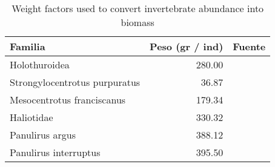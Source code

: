 \begin{table}[H]

\caption{\label{tab:w_fact}Weight factors used to convert invertebrate abundance into biomass}
\centering
\begin{tabular}[t]{lrl}
\toprule
Familia & Peso (gr / ind) & Fuente\\
\midrule
Holothuroidea & 280.00 & \cite{chavez2011stock}\\
Strongylocentrotus purpuratus & 36.87 & \cite{smith2021variation,dof_erizo}\\
Mesocentrotus franciscanus & 179.34 & \cite{leus2014framework,dof_erizo}\\
Haliotidae & 330.32 & \cite{rossetto2013reproductive,dof_abulon}\\
Panulirus argus & 388.12 & \cite{neilson2011assessment,dof_langosta}\\
\addlinespace
Panulirus interruptus & 395.50 & \cite{murray1996analysis,dof_langosta}\\
\bottomrule
\end{tabular}
\end{table}
